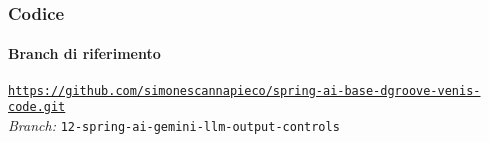 %
\begin{frame}[fragile] \frametitle{Codice}
    \framesubtitle{Branch di riferimento}
	\begin{center}
		{\scriptsize \href{https://github.com/simonescannapieco/spring-ai-base-dgroove-venis-code.git}{\texttt{https://github.com/simonescannapieco/spring-ai-base-dgroove-venis-code.git}}}\\
		\textit{Branch:} \alert{\texttt{12-spring-ai-gemini-llm-output-controls}}
	\end{center}
\end{frame}